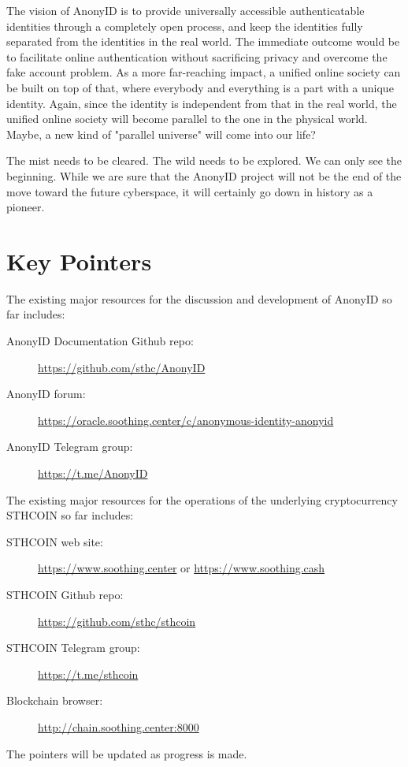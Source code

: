 \documentclass[12pt, a4paper]{article}
\begin{document}
The vision of AnonyID is to provide universally accessible authenticatable identities through a completely open process, and keep the identities fully separated from the identities in the real world. The immediate outcome would be to facilitate online authentication without sacrificing privacy and overcome the fake account problem. As a more far-reaching impact, a unified online society can be built on top of that, where everybody and everything is a part with a unique identity. Again, since the identity is independent from that in the real world, the unified online society will become parallel to the one in the physical world. Maybe, a new kind of "parallel universe" will come into our life?

The mist needs to be cleared. The wild needs to be explored. We can only see the beginning. While we are sure that the AnonyID project will not be the end of the move toward the future cyberspace, it will certainly go down in history as a pioneer. 

\section{Key Pointers}

The existing major resources for the discussion and development of AnonyID so far includes:

\begin{description}
\item[AnonyID Documentation Github repo:] \href{https://github.com/sthc/AnonyID}{https://github.com/sthc/AnonyID}
\item[AnonyID forum:] \href{https://oracle.soothing.center/c/anonymous-identity-anonyid}{https://oracle.soothing.center/c/anonymous-identity-anonyid}
\item[AnonyID Telegram group:] \href{https://t.me/AnonyID}{https://t.me/AnonyID}
\end{description}

The existing major resources for the operations of the underlying cryptocurrency STHCOIN so far includes:

\begin{description}
\item[STHCOIN web site:] \href{https://www.soothing.center}{https://www.soothing.center} or  \href{https://www.soothing.cash}{https://www.soothing.cash}
\item[STHCOIN Github repo:] \href{https://github.com/sthc/sthcoin}{https://github.com/sthc/sthcoin}
\item[STHCOIN Telegram group:] \href{https://t.me/sthcoin}{https://t.me/sthcoin}
\item[Blockchain browser:] \href{http://chain.soothing.center:8000}{http://chain.soothing.center:8000}
\end{description}

The pointers will be updated as progress is made.
\end{document}
